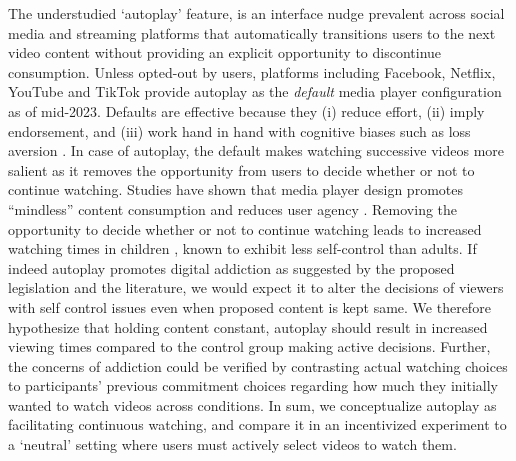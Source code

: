 \documentclass[11pt,a4paper,oneside]{article}
\begin{document}
The understudied `autoplay' feature, is an interface nudge prevalent across social media and streaming platforms that automatically transitions users to the next video content without providing an explicit opportunity to discontinue consumption. Unless opted-out by users, platforms including Facebook, Netflix, YouTube and TikTok provide autoplay as the \textit{default} media player configuration as of mid-2023. Defaults are effective because they (i) reduce effort, (ii) imply endorsement, and (iii) work hand in hand with cognitive biases such as loss aversion \citep{smith2013choice}. In case of autoplay, the default makes watching successive videos more salient as it removes the opportunity from users to decide whether or not to continue watching. Studies have shown that media player design promotes ``mindless'' content consumption and reduces user agency \citep{lukoff2021design}. Removing the opportunity to decide whether or not to continue watching leads to increased watching times in children \citep{hiniker2018coco}, known to exhibit less self-control than adults. If indeed autoplay promotes  digital addiction as suggested by the proposed legislation and the literature, we would expect it to alter the decisions of viewers with self control issues even when proposed content is kept same. We therefore hypothesize that holding content constant, autoplay should result in increased viewing times compared to the control group making active decisions. Further, the concerns of addiction could be verified by contrasting actual watching choices to participants' previous commitment choices regarding how much they initially wanted to watch videos across conditions. In sum, we conceptualize autoplay as facilitating continuous watching, and compare it in an incentivized experiment to a `neutral' setting  where users must actively select videos to watch them.


\end{document}
